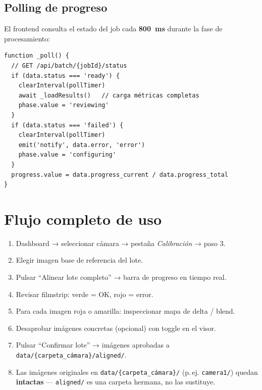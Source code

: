 \subsection{Polling de progreso}

El frontend consulta el estado del job cada \textbf{800~ms} durante la fase de procesamiento:

\begin{codebox}[]
\begin{verbatim}
function _poll() {
  // GET /api/batch/{jobId}/status
  if (data.status === 'ready') {
    clearInterval(pollTimer)
    await _loadResults()   // carga métricas completas
    phase.value = 'reviewing'
  }
  if (data.status === 'failed') {
    clearInterval(pollTimer)
    emit('notify', data.error, 'error')
    phase.value = 'configuring'
  }
  progress.value = data.progress_current / data.progress_total
}
\end{verbatim}
\end{codebox}

\section{Flujo completo de uso}

\begin{enumerate}[leftmargin=1.5em, label=\textbf{\arabic*.}]
  \item Dashboard → seleccionar cámara → pestaña \textit{Calibración} → paso 3.
  \item Elegir imagen base de referencia del lote.
  \item Pulsar ``Alinear lote completo'' → barra de progreso en tiempo real.
  \item Revisar filmstrip: verde = OK, rojo = error.
  \item Para cada imagen roja o amarilla: inspeccionar mapa de delta / blend.
  \item Desaprobar imágenes concretas (opcional) con toggle en el visor.
  \item Pulsar ``Confirmar lote'' → imágenes aprobadas a \texttt{data/\{carpeta\_cámara\}/aligned/}.
  \item Las imágenes originales en \texttt{data/\{carpeta\_cámara\}/} (p.\,ej. \texttt{camera1/})
        quedan \textbf{intactas} — \texttt{aligned/} es una carpeta hermana, no las sustituye.
\end{enumerate}

